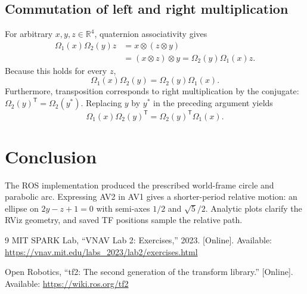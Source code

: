 \documentclass[letterpaper,10pt,conference]{ieeeconf}
\newcommand{\R}{\mathbb{R}}
\newcommand{\T}{\mathsf{T}}
\begin{document}
\subsection{Commutation of left and right multiplication}
For arbitrary $x,y,z\in\R^4$, quaternion associativity gives
\begin{align}
\Omega_1(x)\Omega_2(y)z
&=x\otimes(z\otimes y)\\
&=(x\otimes z)\otimes y
=\Omega_2(y)\Omega_1(x)z.
\end{align}
Because this holds for every $z$,
\begin{equation}
\Omega_1(x)\Omega_2(y)=\Omega_2(y)\Omega_1(x).
\end{equation}
Furthermore, transposition corresponds to right multiplication by the conjugate: $\Omega_2(y)^{\T}=\Omega_2(y^{*})$. Replacing $y$ by $y^{*}$ in the preceding argument yields
\begin{equation}
\Omega_1(x)\Omega_2(y)^{\T}=\Omega_2(y)^{\T}\Omega_1(x).
\end{equation}

\section{Conclusion}
The ROS implementation produced the prescribed world-frame circle and parabolic arc. Expressing AV2 in AV1 gives a shorter-period relative motion: an ellipse on $2y-z+1=0$ with semi-axes $1/2$ and $\sqrt{5}/2$. Analytic plots clarify the RViz geometry, and saved TF positions sample the relative path.

\begin{thebibliography}{9}
MIT SPARK Lab, ``VNAV Lab 2: Exercises,'' 2023. [Online]. Available: \url{https://vnav.mit.edu/labs_2023/lab2/exercises.html}

Open Robotics, ``tf2: The second generation of the transform library.'' [Online]. Available: \url{https://wiki.ros.org/tf2}
\end{thebibliography}
\end{document}
